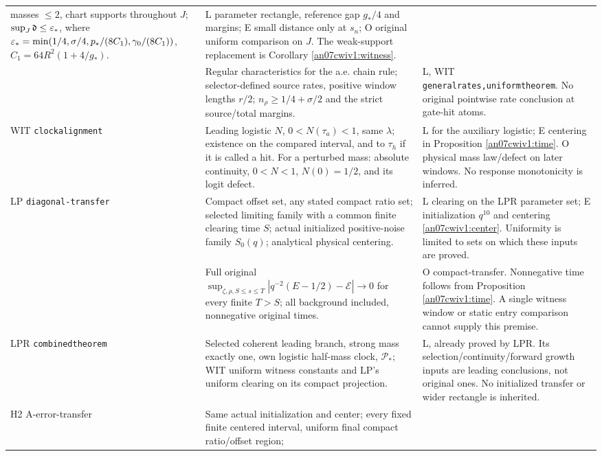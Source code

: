 \documentclass[11pt]{article}
\numberwithin{equation}{section}
\theoremstyle{remark}\newtheorem{remark}[theorem]{Remark}
\newcommand{\dist}{\mathfrak d}
\begin{document}
\begin{longtable}{>{\raggedright\arraybackslash}p{}>{\raggedright\arraybackslash}p{}>{\raggedright\arraybackslash}p{}}
 masses \(\le2\), chart supports throughout \(J\);
 \(\sup_J\dist\le\eps_*\), where
 \(\varepsilon_*=\min(1/4,\sigma/4,p_*/(8C_1),\gamma_0/(8C_1))\),
 \(C_1=64R^2(1+4/g_*)\).
& L parameter rectangle, reference gap \(g_*/4\) and margins;
 E small distance only at \(s_n\); O original uniform comparison
 on \(J\). The weak-support replacement is
 Corollary \ref{an07cwiv1:witness}.\\
& Regular characteristics for the a.e. chain rule;
 selector-defined source rates, positive window lengths \(r/2\);
 \(n_\rho\ge1/4+\sigma/2\) and the strict source/total margins.
& L, WIT \texttt{generalrates,uniformtheorem}. No original
 pointwise rate conclusion at gate-hit atoms.\\
WIT \texttt{clockalignment}
& Leading logistic \(N\), \(0<N(\tau_a)<1\), same \(\lambda\);
 existence on the compared interval, and to \(\tau_h\) if it
 is called a hit. For a perturbed mass: absolute continuity,
 \(0<N<1\), \(N(0)=1/2\), and its logit defect.
& L for the auxiliary logistic; E centering in
 Proposition \ref{an07cwiv1:time}. O physical mass law/defect
 on later windows. No response monotonicity is inferred.\\
LP \texttt{diagonal-transfer}
& Compact offset set, any stated compact ratio set; selected
 limiting family with a common finite clearing time \(S\);
 actual initialized positive-noise family \(S_0(q)\);
 analytical physical centering.
& L clearing on the LPR parameter set; E initialization \(q^{10}\)
 and centering \eqref{an07cwiv1:center}. Uniformity is limited to
 sets on which these inputs are proved.\\
& Full original \(\sup_{\zeta,\rho,S\le s\le T}
 |q^{-2}(E-1/2)-\mathcal E|\to0\) for every finite \(T>S\);
 all background included, nonnegative original times.
& O compact-transfer. Nonnegative time follows from
 Proposition \ref{an07cwiv1:time}. A single witness window or
 static entry comparison cannot supply this premise.\\
LPR \texttt{combinedtheorem}
& Selected coherent leading branch, strong mass exactly one,
 own logistic half-mass clock, \(\mathcal P_*\);
 WIT uniform witness constants and LP's uniform clearing on
 its compact projection.
& L, already proved by LPR. Its selection/continuity/forward
 growth inputs are leading conclusions, not original ones.
 No initialized transfer or wider rectangle is inherited.\\
H2 A-error-transfer
& Same actual initialization and center; every fixed finite
 centered interval, uniform final compact ratio/offset region;

\end{longtable}
\end{document}
